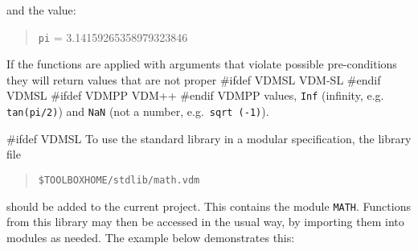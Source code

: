 \documentclass[\pformat,12pt]{article}
\newcommand{\vdmslpp}[2]{%
#ifdef VDMSL
#1
#endif VDMSL
#ifdef VDMPP
#2
#endif VDMPP
}
\newcommand{\vdmsl}{VDM-SL}
\newcommand{\vdmpp}{VDM++}
\begin{document}
and the value:

\begin{quote}
\texttt{pi} = 3.14159265358979323846
\end{quote}

If the functions are applied with arguments that violate possible
pre-conditions they will return values that are not proper
\vdmslpp{\vdmsl}{\vdmpp} values, {\tt Inf} (infinity, e.g.\ {\tt
  tan(pi/2)}) and {\tt NaN} (not a number, e.g.\ {\tt sqrt (-1)}).


#ifdef VDMSL
% 
% 
% 
% 
% 
% 
% 
% 
To use the standard library in a modular specification, the library file 
\begin{quote}
\verb+$TOOLBOXHOME/stdlib/math.vdm+
\end{quote}
should be added to the
current project. This contains the module \texttt{MATH}. Functions
from this library may then be accessed in the usual way, by importing
them into modules as needed. The example below demonstrates this:
\end{document}
